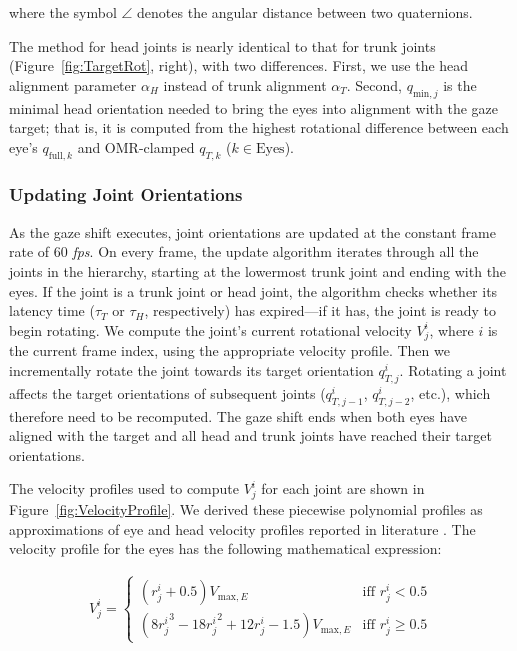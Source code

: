 where the symbol $\angle$ denotes the angular distance between two quaternions.

The method for head joints is nearly identical to that for trunk joints (Figure~\ref{fig:TargetRot}, right), with two differences. First, we use the head alignment parameter $\alpha_H$ instead of trunk alignment $\alpha_T$. Second, $q_{\mathrm{min},j}$ is the minimal head orientation needed to bring the eyes into alignment with the gaze target; that is, it is computed from the highest rotational difference between each eye's $q_{\mathrm{full},k}$ and OMR-clamped $q_{T,k}$ ($k \in \mathrm{Eyes}$).

\subsubsection{Updating Joint Orientations}

As the gaze shift executes, joint orientations are updated at the constant frame rate of 60 \emph{fps}. On every frame, the update algorithm iterates through all the joints in the hierarchy, starting at the lowermost trunk joint and ending with the eyes. If the joint is a trunk joint or head joint, the algorithm checks whether its latency time ($\tau_T$ or $\tau_H$, respectively) has expired---if it has, the joint is ready to begin rotating. We compute the joint's current rotational velocity $V^i_j$, where $i$ is the current frame index, using the appropriate velocity profile. Then we incrementally rotate the joint towards its target orientation $q^i_{T,j}$. Rotating a joint affects the target orientations of subsequent joints ($q^i_{T,j-1}$, $q^i_{T,j-2}$, etc.), which therefore need to be recomputed. The gaze shift ends when both eyes have aligned with the target and all head and trunk joints have reached their target orientations.

The velocity profiles used to compute $V^i_j$ for each joint are shown in Figure~\ref{fig:VelocityProfile}. We derived these piecewise polynomial profiles as approximations of eye and head velocity profiles reported in literature \cite{kim2007head,lee2002eyes}. The velocity profile for the eyes has the following mathematical expression:

\begin{align} \label{eq:EyeVelocity}
V^i_j = \begin{cases}
(r^i_j + 0.5)V_{\mathrm{max},E} & \mbox{iff } r^i_j < 0.5 \\
(8{r^i_j}^3 - 18{r^i_j}^2 + 12r^i_j - 1.5)V_{\mathrm{max},E} & \mbox{iff } r^i_j \geq 0.5
\end{cases}
\end{align}

